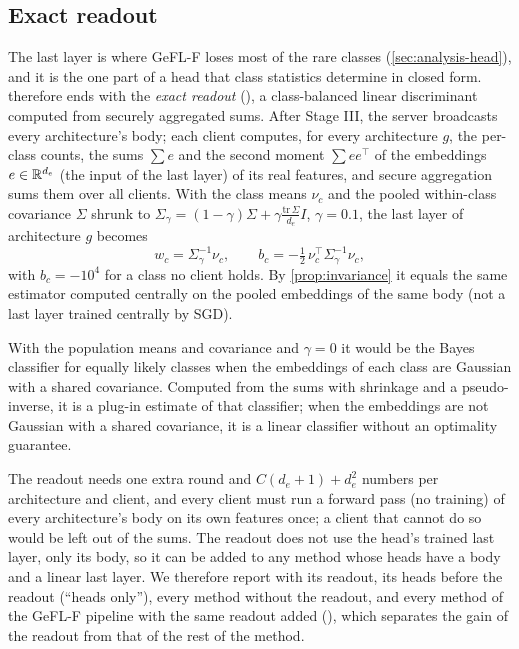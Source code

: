 \subsection{Exact readout}\label{sec:method-readout}

The last layer is where GeFL-F loses most of the rare classes (\cref{sec:analysis-head}), and it is the one part of a
head that class statistics determine in closed form. \ours therefore ends with the \emph{exact readout} (\ER), a
class-balanced linear discriminant computed from securely aggregated sums. After Stage III, the server broadcasts every architecture's body; each client computes, for every architecture $g$, the
per-class counts, the sums $\sum e$ and the second moment $\sum ee^\top$ of the embeddings $e\in\mathbb{R}^{d_e}$ (the input of the last layer) of its
real features, and
secure aggregation sums them over all clients. With the class means $\nu_c$ and the pooled within-class covariance
$\Sigma$ shrunk to $\Sigma_\gamma=(1-\gamma)\Sigma+\gamma\frac{\mathrm{tr}\,\Sigma}{d_e}I$, $\gamma=0.1$, the last layer of
architecture $g$ becomes
\begin{equation}\label{eq:er}
w_c=\Sigma_\gamma^{-1}\nu_c,\qquad b_c=-\tfrac12\,\nu_c^\top\Sigma_\gamma^{-1}\nu_c,
\end{equation}
with $b_c=-10^4$ for a class no client holds. By \cref{prop:invariance} it equals the same estimator computed
centrally on the pooled embeddings of the same body (not a last layer trained centrally by SGD).

With the population
means and covariance and $\gamma=0$ it would be the Bayes classifier for equally likely classes when the embeddings of
each class are Gaussian with a shared covariance. Computed from the sums with shrinkage and a pseudo-inverse, it is a
plug-in estimate of that classifier; when the embeddings are not Gaussian with a shared covariance, it is a linear
classifier without an optimality guarantee.

The readout needs one extra round and
$C(d_e+1)+d_e^2$ numbers per architecture and client, and every client must run a forward pass (no training) of
every architecture's body on its own features once; a client that cannot do so would be left out of the sums. The
readout does not use the head's trained last layer, only its body, so it can be added to any method whose heads have
a body and a linear last layer. We therefore report \ours with its readout, its heads before the readout (``heads
only''), every method without the readout, and every method of the GeFL-F pipeline with the same readout added (\ER), which
separates the gain of the readout from that of the rest of the method.

